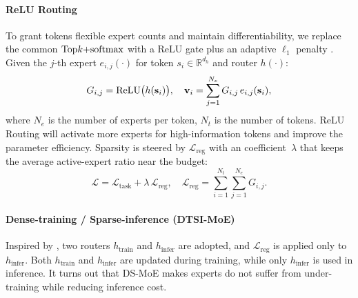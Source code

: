 \paragraph{ReLU Routing}
To grant tokens flexible expert counts and maintain differentiability, we replace the common
\(\text{Top}k {+} {\rm softmax} \) with a ReLU gate plus an adaptive $\ell_1$ penalty
\cite{Wang2024remoe}. Given the $j$-th expert $e_{i,j}(\cdot)$ for token $s_i\!\in\!\mathbb{R}^{d_h}$ and router $h(\cdot)$:
\begin{equation}
  G_{i, j} = {\rm ReLU} \bigl(h(\mathbf{s}_i)\bigr), \quad
  \mathbf{v}_i = \sum_{j=1}^{N_e} G_{i, j}\, e_{i, j}(\mathbf{s}_i),
  \label{eq:dsmoe_forward}
\end{equation}
where $N_e$ is the number of experts per token, $N_t$ is the number of tokens.
ReLU Routing will activate more experts for high-information tokens and improve the parameter efficiency.
Sparsity is steered by
\(\mathcal{L}_{\mathrm{reg}}\) with an coefficient~$\lambda$ that
keeps the average active-expert ratio near the budget:
\begin{equation}
  \mathcal{L}= \mathcal{L}_{\text{task}}
              +\lambda\,\mathcal{L}_{\mathrm{reg}},
  \quad
  \mathcal{L}_{\mathrm{reg}}
  =\sum_{i=1}^{N_t}\sum_{j=1}^{N_e} G_{i,j}.
  \label{eq:relu_loss}
\end{equation}

\paragraph{Dense-training / Sparse-inference (DTSI-MoE)}

Inspired by \cite{pan2024ads}, two routers $h_{\text{train}}$ and $h_{\text{infer}}$ are adopted, and $\mathcal{L}_{\mathrm{reg}}$ is applied only to $h_{\text{infer}}$. Both $h_{\text{train}}$ and $h_{\text{infer}}$ are updated during training, while only $h_{\text{infer}}$ is used in inference. It turns out that DS-MoE makes experts do not suffer from under-training while reducing inference cost.


